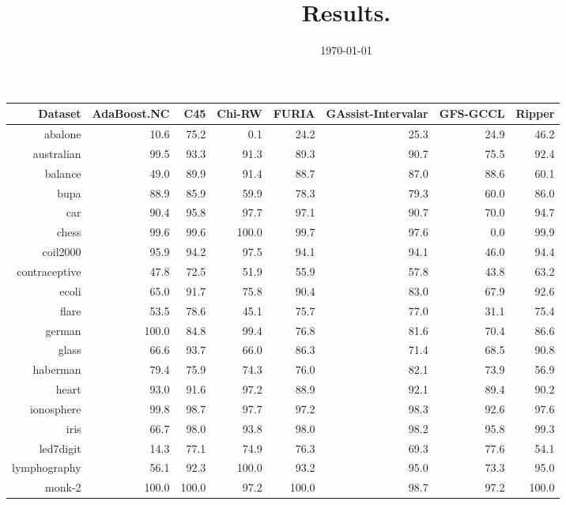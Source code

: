 \documentclass[a4paper,10pt]{article}
\title{Results.}
\date{\today}
\author{}
\begin{document}
\pagestyle{empty}
\maketitle
\thispagestyle{empty}

\begin{table}[!htp]
\centering\scriptsize
\begin{tabular}{
|r|r|r|r|r|r|r|r|}
\hline
 
Dataset & AdaBoost.NC & C45 & Chi-RW & FURIA & GAssist-Intervalar & GFS-GCCL & Ripper\\
\hline
abalone & 10.6 & 75.2 & 0.1 & 24.2 & 25.3 & 24.9 & 46.2\\
\hline
australian & 99.5 & 93.3 & 91.3 & 89.3 & 90.7 & 75.5 & 92.4\\
\hline
balance & 49.0 & 89.9 & 91.4 & 88.7 & 87.0 & 88.6 & 60.1\\
\hline
bupa & 88.9 & 85.9 & 59.9 & 78.3 & 79.3 & 60.0 & 86.0\\
\hline
car & 90.4 & 95.8 & 97.7 & 97.1 & 90.7 & 70.0 & 94.7\\
\hline
chess & 99.6 & 99.6 & 100.0 & 99.7 & 97.6 & 0.0 & 99.9\\
\hline
coil2000 & 95.9 & 94.2 & 97.5 & 94.1 & 94.1 & 46.0 & 94.4\\
\hline
contraceptive & 47.8 & 72.5 & 51.9 & 55.9 & 57.8 & 43.8 & 63.2\\
\hline
ecoli & 65.0 & 91.7 & 75.8 & 90.4 & 83.0 & 67.9 & 92.6\\
\hline
flare & 53.5 & 78.6 & 45.1 & 75.7 & 77.0 & 31.1 & 75.4\\
\hline
german & 100.0 & 84.8 & 99.4 & 76.8 & 81.6 & 70.4 & 86.6\\
\hline
glass & 66.6 & 93.7 & 66.0 & 86.3 & 71.4 & 68.5 & 90.8\\
\hline
haberman & 79.4 & 75.9 & 74.3 & 76.0 & 82.1 & 73.9 & 56.9\\
\hline
heart & 93.0 & 91.6 & 97.2 & 88.9 & 92.1 & 89.4 & 90.2\\
\hline
ionosphere & 99.8 & 98.7 & 97.7 & 97.2 & 98.3 & 92.6 & 97.6\\
\hline
iris & 66.7 & 98.0 & 93.8 & 98.0 & 98.2 & 95.8 & 99.3\\
\hline
led7digit & 14.3 & 77.1 & 74.9 & 76.3 & 69.3 & 77.6 & 54.1\\
\hline
lymphography & 56.1 & 92.3 & 100.0 & 93.2 & 95.0 & 73.3 & 95.0\\
\hline
monk-2 & 100.0 & 100.0 & 97.2 & 100.0 & 98.7 & 97.2 & 100.0\\

\end{tabular}
\end{table}
\end{document}

